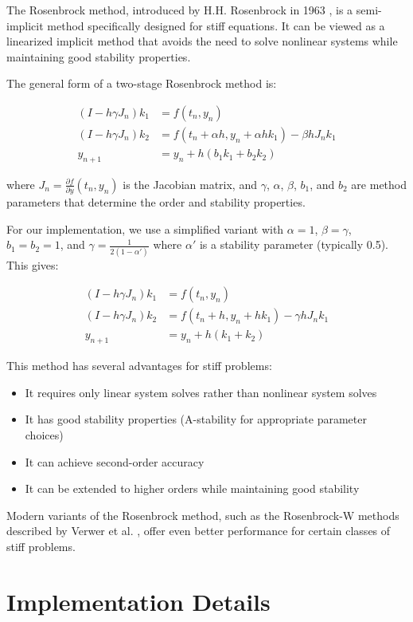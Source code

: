 \documentclass[11pt,a4paper]{article}
\begin{document}
The Rosenbrock method, introduced by H.H. Rosenbrock in 1963 \cite{rosenbrock1963some}, is a semi-implicit method specifically designed for stiff equations. It can be viewed as a linearized implicit method that avoids the need to solve nonlinear systems while maintaining good stability properties.

The general form of a two-stage Rosenbrock method is:

\begin{align}
(I - h\gamma J_n)k_1 &= f(t_n, y_n) \\
(I - h\gamma J_n)k_2 &= f(t_n + \alpha h, y_n + \alpha h k_1) - \beta h J_n k_1 \\
y_{n+1} &= y_n + h(b_1 k_1 + b_2 k_2)
\end{align}

where $J_n = \frac{\partial f}{\partial y}(t_n, y_n)$ is the Jacobian matrix, and $\gamma$, $\alpha$, $\beta$, $b_1$, and $b_2$ are method parameters that determine the order and stability properties.

For our implementation, we use a simplified variant with $\alpha = 1$, $\beta = \gamma$, $b_1 = b_2 = 1$, and $\gamma = \frac{1}{2(1-\alpha')}$ where $\alpha'$ is a stability parameter (typically 0.5). This gives:

\begin{align}
(I - h\gamma J_n)k_1 &= f(t_n, y_n) \\
(I - h\gamma J_n)k_2 &= f(t_n + h, y_n + h k_1) - \gamma h J_n k_1 \\
y_{n+1} &= y_n + h(k_1 + k_2)
\end{align}

This method has several advantages for stiff problems:
\begin{itemize}
    \item It requires only linear system solves rather than nonlinear system solves
    \item It has good stability properties (A-stability for appropriate parameter choices)
    \item It can achieve second-order accuracy
    \item It can be extended to higher orders while maintaining good stability
\end{itemize}

Modern variants of the Rosenbrock method, such as the Rosenbrock-W methods described by Verwer et al. \cite{verwer1999convergence}, offer even better performance for certain classes of stiff problems.

\section{Implementation Details}
\end{document}
